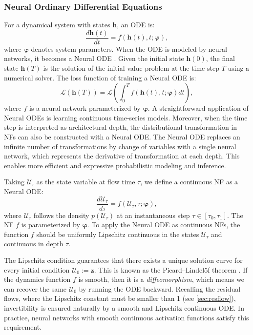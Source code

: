 \subsubsection{Neural Ordinary Differential Equations}
For a dynamical system with states $\boldsymbol{h}$, an \ac{ODE} is:
\begin{equation}
    \frac{d\boldsymbol{h}(t)}{dt} = f(\boldsymbol{h}(t), t; \boldsymbol{\varphi}),
\end{equation}
where $\boldsymbol{\varphi}$ denotes system parameters. When the \ac{ODE} is modeled by neural networks, it becomes a Neural \ac{ODE} \citep{chen2019node}. Given the initial state $\boldsymbol{h}(0)$, the final state $\boldsymbol{h}(T)$ is the solution of the initial value problem at the time step $T$ using a numerical solver. The loss function of training a Neural \ac{ODE} is:
\begin{equation}
    \mathcal{L}(\boldsymbol{h}(T))=\mathcal{L}(\int_0^Tf(\boldsymbol{h}(t), t; \boldsymbol{\varphi})dt),
\end{equation}
where $f$ is a neural network parameterized by $\boldsymbol{\varphi}$.
A straightforward application of Neural \acp{ODE} is learning continuous time-series models. Moreover, when the time step is interpreted as architectural depth, the distributional transformation in \acp{NF} can also be constructed with a Neural \ac{ODE}. The Neural \ac{ODE} replaces an infinite number of transformations by change of variables with a single neural network, which represents the derivative of transformation at each depth. This enables more efficient and expressive probabilistic modeling and inference.

Taking $\mathcal{U}_\tau$ as the state variable at flow time $\tau$, we define a continuous \ac{NF} as a Neural \ac{ODE}:
\begin{equation}
    \label{eq:cnfode}
    \frac{d\mathcal{U}_\tau}{d\tau}=f(\mathcal{U}_\tau,\tau;\boldsymbol{\varphi}),
\end{equation}
where $\mathcal{U}_\tau$ follows the density $p(\mathcal{U}_\tau)$ at an instantaneous step $\tau\in[\tau_0, \tau_1]$. The \ac{NF} $f$ is parameterized by $\boldsymbol{\varphi}$.
To apply the Neural \ac{ODE} as continuous \acp{NF}, the function $f$ should be uniformly Lipschitz continuous in the states $\mathcal{U}_\tau$ and continuous in depth $\tau$. 

The Lipschitz condition guarantees that there exists a unique solution curve for every initial condition $\mathcal{U}_0:=\boldsymbol{z}$. This is known as the Picard–Lindel\"of theorem \citep{coddington1955theory}. If the dynamics function $f$ is smooth, then it is a \textit{diffeomorphism}, which means we can recover the same $\mathcal{U}_0$ by running the \ac{ODE} backward. Recalling the residual flows, where the Lipschitz constant must be smaller than 1 (see \ref{sec:resflow}), invertibility is ensured naturally by a smooth and Lipschitz continuous \ac{ODE}. In practice, neural networks with smooth continuous activation functions satisfy this requirement.

